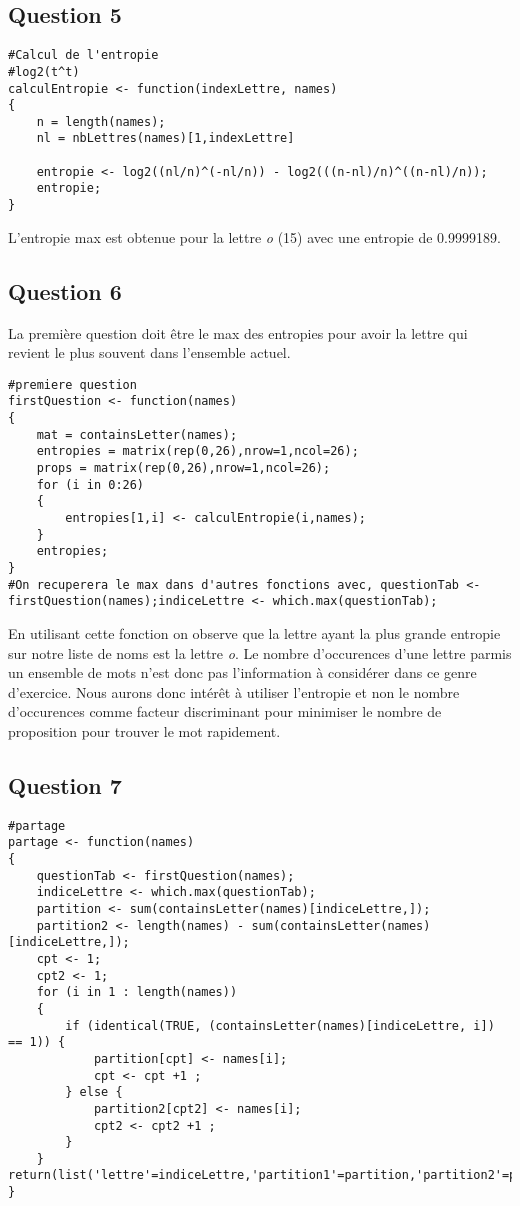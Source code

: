 \documentclass[a4paper,12pt]{report}
\begin{document}
\subsection*{Question 5}

\begin{lstlisting}
#Calcul de l'entropie
#log2(t^t)
calculEntropie <- function(indexLettre, names)
{
	n = length(names);
	nl = nbLettres(names)[1,indexLettre]

	entropie <- log2((nl/n)^(-nl/n)) - log2(((n-nl)/n)^((n-nl)/n));
	entropie;
}
\end{lstlisting}

L'entropie max est obtenue pour la lettre \textit{o} (15) avec une entropie de 0.9999189.

\newpage

\subsection*{Question 6}

La première question doit être le max des entropies pour avoir la lettre qui revient le plus souvent dans l'ensemble actuel.

\begin{lstlisting}
#premiere question
firstQuestion <- function(names)
{
	mat = containsLetter(names);
	entropies = matrix(rep(0,26),nrow=1,ncol=26);
	props = matrix(rep(0,26),nrow=1,ncol=26);
	for (i in 0:26)
	{
		entropies[1,i] <- calculEntropie(i,names);	
	}
	entropies;
}
#On recuperera le max dans d'autres fonctions avec, questionTab <- firstQuestion(names);indiceLettre <- which.max(questionTab);
\end{lstlisting}

En utilisant cette fonction on observe que la lettre ayant la plus grande entropie sur notre liste de noms est la lettre \textit{o}. Le nombre d'occurences d'une lettre parmis un ensemble de mots n'est donc pas l'information à considérer dans ce genre d'exercice. Nous aurons donc intérêt à utiliser l'entropie et non le nombre d'occurences comme facteur discriminant pour minimiser le nombre de proposition pour trouver le mot rapidement.

\newpage

\subsection*{Question 7}

\begin{lstlisting}
#partage
partage <- function(names) 
{
	questionTab <- firstQuestion(names);
	indiceLettre <- which.max(questionTab);
	partition <- sum(containsLetter(names)[indiceLettre,]);
	partition2 <- length(names) - sum(containsLetter(names)[indiceLettre,]);
	cpt <- 1;
	cpt2 <- 1;
	for (i in 1 : length(names))
	{
		if (identical(TRUE, (containsLetter(names)[indiceLettre, i]) == 1)) {
			partition[cpt] <- names[i];
			cpt <- cpt +1 ;
		} else {
			partition2[cpt2] <- names[i];
			cpt2 <- cpt2 +1 ;
		}
	}				    return(list('lettre'=indiceLettre,'partition1'=partition,'partition2'=partition2));	
}
\end{lstlisting}
\end{document}
